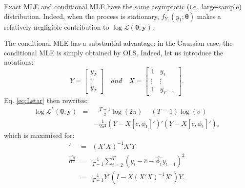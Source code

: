 \documentclass[
  12pt,
]{book}
\theoremstyle{definition}
\theoremstyle{definition}
\theoremstyle{definition}
\theoremstyle{definition}
\theoremstyle{remark}
\begin{document}
Exact MLE and conditional MLE have the same asymptotic (i.e.~large-sample) distribution. Indeed, when the process is stationary, \(f_{Y_1}(y_1;\boldsymbol\theta)\) makes a relatively negligible contribution to \(\log \mathcal{L}(\boldsymbol\theta;\mathbf{y})\).

The conditional MLE has a substantial advantage: in the Gaussian case, the conditional MLE is simply obtained by OLS. Indeed, let us introduce the notations:
\[
Y = \left[\begin{array}{c}
y_2\\
\vdots\\
y_T
\end{array}\right] \quad and \quad
X = \left[\begin{array}{cc}
1 &y_1\\
\vdots&\vdots\\
1&y_{T-1}
\end{array}\right].
\]
Eq. \eqref{eq:Lstar} then rewrites:
\begin{eqnarray}
\log \mathcal{L}^*(\boldsymbol\theta;\mathbf{y})  &=& - \frac{T-1}{2} \log(2\pi) - (T-1)\log(\sigma) \nonumber \\
&& - \frac{1}{2\sigma^2} (Y-X[c,\phi_1]')'(Y-X[c,\phi_1]'),
\end{eqnarray}
which is maximised for:
\begin{eqnarray}
[\hat{c},\hat\phi_1]' &=& (X'X)^{-1}X'Y \label{eq:AROLSmean} \\
\hat{\sigma^2} &=& \frac{1}{T-1} \sum_{t=2}^T (y_t - \hat{c} - \hat{\phi_1}y_{t-1})^2 \nonumber \\
&=& \frac{1}{T-1} Y'(I - X(X'X)^{-1}X')Y. \label{eq:AROLSsigma}
\end{eqnarray}
\end{document}

